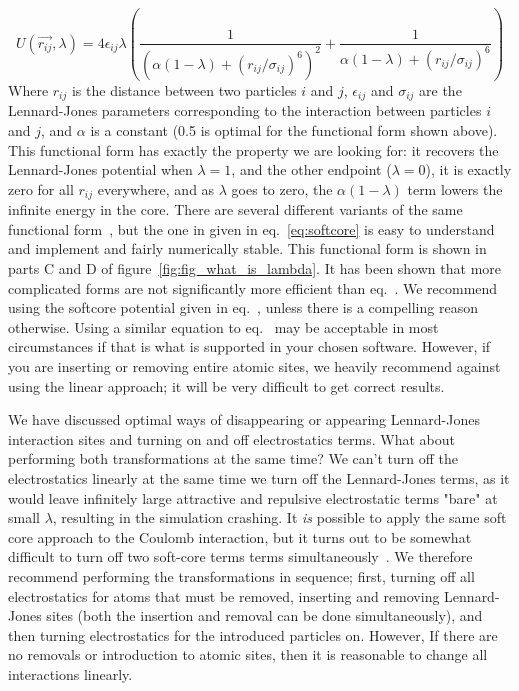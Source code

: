 \documentclass[9pt,bestpractices]{livecoms}
\begin{document}
\begin{equation}
    U(\vec{r_{ij}},\lambda) = 4\epsilon_{ij} \lambda \left(\frac{1}{(\alpha(1-\lambda) + (r_{ij}/\sigma_{ij})^6)^2} +  \frac{1}{\alpha(1-\lambda) + (r_{ij}/\sigma_{ij})^6}\right)\label{eq:softcore}
\end{equation}
Where $r_{ij}$ is the distance between two particles $i$ and $j$, $\epsilon_{ij}$ and $\sigma_{ij}$ are the Lennard-Jones parameters corresponding to the interaction between particles $i$ and $j$, and $\alpha$ is a constant (0.5 is optimal for the functional form shown above).  This functional form has exactly the property we are looking for: it recovers the Lennard-Jones potential when $\lambda=1$, and the other endpoint ($\lambda=0$), it is exactly zero for all $r_{ij}$ everywhere, and as $\lambda$ goes to zero, the  $\alpha(1-\lambda)$ term lowers the infinite energy in the core.  There are several different variants of the same functional form~\cite{Zacharias:JPC:1994,Beutler:CPL:1994,Pham:JCP:2011}, but the one in given in eq.~\ref{eq:softcore} is easy to understand and implement and fairly numerically stable. This functional form is shown in parts C and D of figure~\ref{fig:fig_what_is_lambda}.
It has been shown that more complicated forms are not significantly more efficient than eq.~\cite{Pham:JCP:2012}.  We recommend using the softcore potential given in eq.~\cite{eq:softcore}, unless there is a compelling reason otherwise.  Using a similar equation to eq.~\cite{eq:softcore} may be acceptable in most circumstances if that is what is supported in your chosen software. However, if you are inserting or removing entire atomic sites, we heavily recommend against using the linear approach; it will be very difficult to get correct results. 

We have discussed optimal ways of disappearing or appearing Lennard-Jones interaction sites and turning on and off electrostatics terms.  What about performing both transformations at the same time? We can't turn off the electrostatics linearly at the same time we turn off the Lennard-Jones terms, as it would leave infinitely large attractive and repulsive electrostatic terms "bare" at small $\lambda$, resulting in the simulation crashing. It \textit{is} possible to apply the same soft core approach to the Coulomb interaction, but it turns out to be somewhat difficult to turn off two soft-core terms  terms simultaneously~\cite{Steinbrecher:JCC:2011}.  We therefore recommend performing the transformations in sequence; first, turning off all electrostatics for atoms that must be removed, inserting and removing Lennard-Jones sites (both the insertion and removal can be done simultaneously), and then turning electrostatics for the introduced particles on.  However, If there are no removals or introduction to atomic sites, then it is reasonable to change all interactions linearly.  
\end{document}
